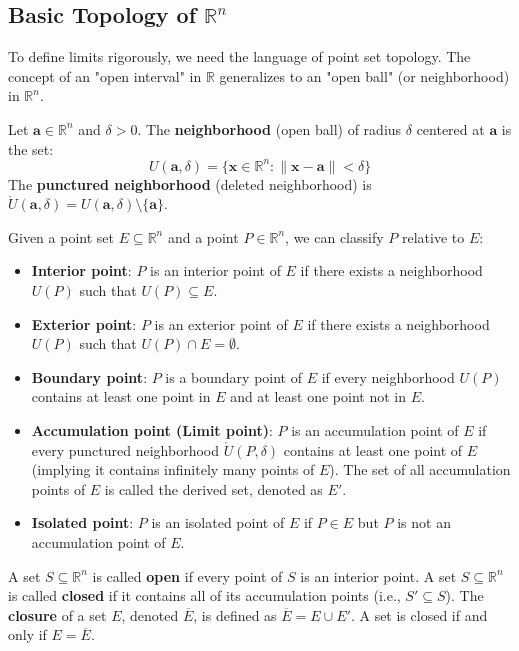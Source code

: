 \subsection{Basic Topology of \texorpdfstring{$\mathbb{R}^n$}{R n}}

To define limits rigorously, we need the language of point set topology. The concept of an "open interval" in $\mathbb{R}$ generalizes to an "open ball" (or neighborhood) in $\mathbb{R}^n$.

\begin{definition}
Let $\mathbf{a} \in \mathbb{R}^n$ and $\delta > 0$. The \textbf{neighborhood} (open ball) of radius $\delta$ centered at $\mathbf{a}$ is the set:
\[ U(\mathbf{a}, \delta) = \{ \mathbf{x} \in \mathbb{R}^n : \|\mathbf{x} - \mathbf{a}\| < \delta \} \]
The \textbf{punctured neighborhood} (deleted neighborhood) is $\mathring{U}(\mathbf{a}, \delta) = U(\mathbf{a}, \delta) \setminus \{\mathbf{a}\}$.
\end{definition}

Given a point set $E \subseteq \mathbb{R}^n$ and a point $P \in \mathbb{R}^n$, we can classify $P$ relative to $E$:
\begin{itemize}
    \item \textbf{Interior point}: $P$ is an interior point of $E$ if there exists a neighborhood $U(P)$ such that $U(P) \subseteq E$.
    \item \textbf{Exterior point}: $P$ is an exterior point of $E$ if there exists a neighborhood $U(P)$ such that $U(P) \cap E = \emptyset$.
    \item \textbf{Boundary point}: $P$ is a boundary point of $E$ if every neighborhood $U(P)$ contains at least one point in $E$ and at least one point not in $E$.
    \item \textbf{Accumulation point (Limit point)}: $P$ is an accumulation point of $E$ if every punctured neighborhood $\mathring{U}(P, \delta)$ contains at least one point of $E$ (implying it contains infinitely many points of $E$). The set of all accumulation points of $E$ is called the derived set, denoted as $E'$.
    \item \textbf{Isolated point}: $P$ is an isolated point of $E$ if $P \in E$ but $P$ is not an accumulation point of $E$.
\end{itemize}

\begin{definition}
A set $S \subseteq \mathbb{R}^n$ is called \textbf{open} if every point of $S$ is an interior point.
A set $S \subseteq \mathbb{R}^n$ is called \textbf{closed} if it contains all of its accumulation points (i.e., $S' \subseteq S$).
The \textbf{closure} of a set $E$, denoted $\overline{E}$, is defined as $\overline{E} = E \cup E'$. A set is closed if and only if $E = \overline{E}$.
\end{definition}

